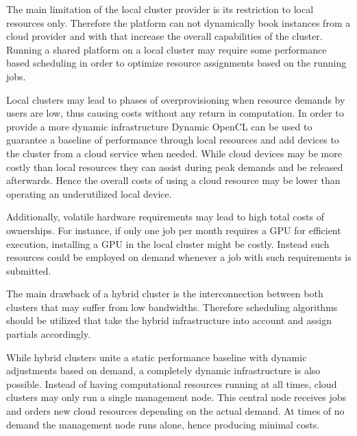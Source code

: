 \begin{description}[style=nextline]
	The main limitation of the local cluster provider is its restriction to local resources only. Therefore the platform can not dynamically book instances from a cloud provider and with that increase the overall capabilities of the cluster. Running a shared platform on a local cluster may require some performance based scheduling in order to optimize resource assignments based on the running jobs.

	\item[Hybrid Cloud Provider]
	Local clusters may lead to phases of overprovisioning when resource demands by users are low, thus causing costs without any return in computation. In order to provide a more dynamic infrastructure Dynamic OpenCL can be used to guarantee a baseline of performance through local resources and add devices to the cluster from a cloud service when needed. While cloud devices may be more costly than local resources they can assist during peak demands and be released afterwards. Hence the overall costs of using a cloud resource may be lower than operating an underutilized local device.

	Additionally, volatile hardware requirements may lead to high total costs of ownerships. For instance, if only one job per month requires a GPU for efficient execution, installing a GPU in the local cluster might be costly. Instead such resources could be employed on demand whenever a job with such requirements is submitted.

	The main drawback of a hybrid cluster is the interconnection between both clusters that may suffer from low bandwidths. Therefore scheduling algorithms should be utilized that take the hybrid infrastructure into account and assign partials accordingly.

	\item[Cloud Cluster Provider]
	While hybrid clusters unite a static performance baseline with dynamic adjustments based on demand, a completely dynamic infrastructure is also possible. Instead of having computational resources running at all times, cloud clusters may only run a single management node. This central node receives jobs and orders new cloud resources depending on the actual demand. At times of no demand the management node runs alone, hence producing minimal costs.


\end{description}
